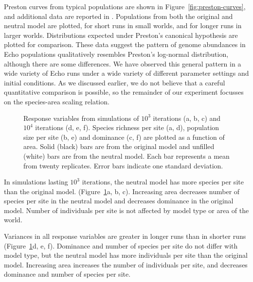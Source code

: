 Preston curves from typical populations are shown in
Figure~\ref{fig:preston-curves}, and additional data are reported in
\cite{ForrestAndJones94}.  Populations from both the original and
neutral model are plotted, for short runs in small worlds, and for
longer runs in larger worlds.  Distributions expected under Preston's
canonical hypothesis are plotted for comparison.  These data suggest
the pattern of genome abundances in Echo populations qualitatively
resembles Preston's log-normal distribution, although there are some
differences.  We have observed this general pattern in a wide variety
of Echo runs under a wide variety of different parameter settings and
initial conditions.  As we discussed earlier, we do not believe that a
careful quantitative comparison is possible, so the remainder
of our experiment focusses on the species-area scaling relation.

\begin{figure}[t!]
\begin{center}
\leavevmode
\ifepsf
{}
\else
\fi
\caption{Response variables from simulations of $10^3$ iterations
  (a, b, c) and $10^4$ iterations (d, e, f).  Species richness per site
  (a, d), population size per site (b, e) and dominance (c, f) are
  plotted as a function of area.  Solid (black) bars are from the
  original model and unfilled (white) bars are from the neutral model.
  Each bar represents a mean from twenty replicates.  Error bars
  indicate one standard deviation.
\label{fig:anova-response-vars}}
\end{center}
\end{figure}

In simulations lasting $10^3$ iterations, the neutral model
has more species per site than the original model.
(Figure~\ref{fig:anova-response-vars}a, b, c).  Increasing area
decreases number of species per site in the neutral model and
decreases dominance in the original model.  Number of individuals per
site is not affected by model type or area of the world.  

Variances in all response variables are greater in longer runs than
in shorter runs (Figure~\ref{fig:anova-response-vars}d, e, f).
Dominance and number of species per site do not differ with model type,
but the neutral model has more individuals per site than the
original model.  Increasing area increases the number of individuals per
site, and decreases dominance and number of species per site.

